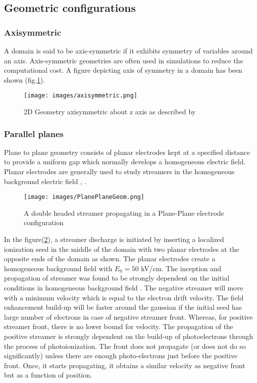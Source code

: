 \documentclass[paper=a4, fontsize=13pt]{scrartcl}
\begin{document}
\subsection{Geometric configurations}


\subsubsection{Axisymmetric}

A domain is said to be axis-symmetric if it exhibits symmetry of variables around an axis. Axis-symmetric geometries are often used in simulations to reduce the computational cost. A figure depicting axis of symmetry in a domain has been shown (fig.\ref{fig:axisymmetric}).

\begin{figure}
\centering
\texttt{[image: images/axisymmetric.png]}
 \caption{2D Geometry axisymmetric about z axis as described by \cite{Liu2017ApplicationGeometries} }
  \label{fig:axisymmetric}
\end{figure}


\subsubsection{Parallel planes}

Plane to plane geometry consists of planar electrodes kept at a specified distance to provide a uniform gap which normally develops a homogeneous electric field. Planar electrodes are generally used to study streamers in the homogeneous background electric field \cite{Luque2008PositiveVelocities}, \cite{Montijn2006AnStreamers}. 

\begin{figure}
\centering
\texttt{[image: images/PlanePlaneGeom.png]}
 \caption{A double headed streamer propagating in a Plane-Plane electrode configuration \cite{Luque2008PositiveVelocities} }
  \label{fig:Plane to Plane geometry}
\end{figure}


In the figure(\ref{fig:Plane to Plane geometry}), a streamer discharge is initiated by inserting a localized ionization seed in the middle of the domain with two planar electrodes at the opposite ends of the domain as shown. The planar electrodes create a homogeneous background field with $E_0 = 50$ kV/cm. The inception and propagation of streamer was found to be strongly dependent on the initial conditions in homogeneous background field \cite{Luque2008PositiveVelocities}. The negative streamer will move with a minimum velocity which is equal to the electron drift velocity. The field enhancement build-up will be faster around the gaussian if the initial seed has large number of electrons in case of negative streamer front. Whereas, for positive streamer front, there is no lower bound for velocity. The propagation of the positive streamer is strongly dependent on the build-up of photoelectrons through the process of photoionization. The front does not propagate (or does not do so significantly) unless there are enough photo-electrons just before the positive front. Once, it starts propagating, it obtains a similar velocity as negative front but as a function of position.
\end{document}
